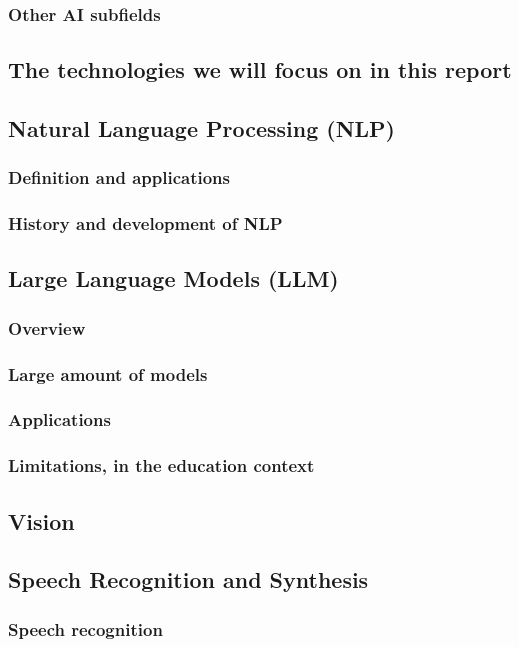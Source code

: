 \documentclass{article}
\begin{document}
\subsubsection{Other AI subfields}
\subsection{The technologies we will focus on in this report}
\subsection{Natural Language Processing (NLP)}
\subsubsection{Definition and applications}
\subsubsection{History and development of NLP}
\subsection{Large Language Models (LLM)}
\subsubsection{Overview}
\subsubsection{Large amount of models}
\subsubsection{Applications}
\subsubsection{Limitations, in the education context}
\subsection{Vision}
\subsection{Speech Recognition and Synthesis}
\subsubsection{Speech recognition}
\end{document}
